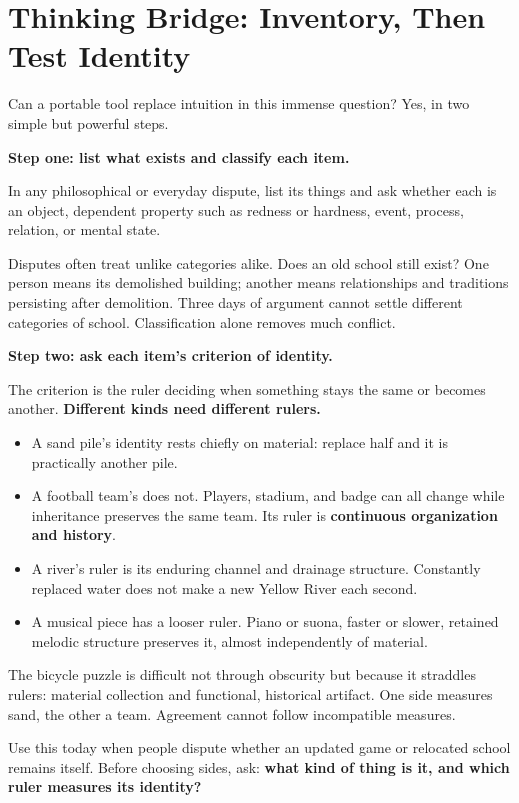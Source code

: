 \section[Inventory, Then Test Identity]{Thinking Bridge: Inventory, Then Test Identity}
Can a portable tool replace intuition in this immense question? Yes, in two simple but powerful steps.

\textbf{Step one: list what exists and classify each item.}

In any philosophical or everyday dispute, list its things and ask whether each is an object, dependent property such as redness or hardness, event, process, relation, or mental state.

Disputes often treat unlike categories alike. Does an old school still exist? One person means its demolished building; another means relationships and traditions persisting after demolition. Three days of argument cannot settle different categories of school. Classification alone removes much conflict.

\textbf{Step two: ask each item's criterion of identity.}

The criterion is the ruler deciding when something stays the same or becomes another. \textbf{Different kinds need different rulers.}

\begin{itemize}
\item A sand pile's identity rests chiefly on material: replace half and it is practically another pile.
\item A football team's does not. Players, stadium, and badge can all change while inheritance preserves the same team. Its ruler is \textbf{continuous organization and history}.
\item A river's ruler is its enduring channel and drainage structure. Constantly replaced water does not make a new Yellow River each second.
\item A musical piece has a looser ruler. Piano or suona, faster or slower, retained melodic structure preserves it, almost independently of material.
\end{itemize}
The bicycle puzzle is difficult not through obscurity but because it straddles rulers: material collection and functional, historical artifact. One side measures sand, the other a team. Agreement cannot follow incompatible measures.

Use this today when people dispute whether an updated game or relocated school remains itself. Before choosing sides, ask: \textbf{what kind of thing is it, and which ruler measures its identity?}

